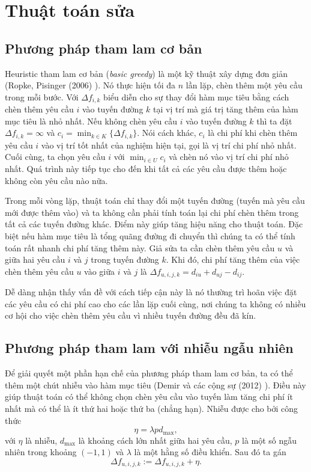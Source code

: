 \section{Thuật toán sửa}

\subsection{Phương pháp tham lam cơ bản}
\label{sec:basic_greedy}
Heuristic tham lam cơ bản (\textit{basic greedy}) là một kỹ thuật xây dựng đơn giản (Ropke, Pisinger (2006) \cite{ropke2006adaptive}). Nó thực hiện tối đa $n$ lần lặp, chèn thêm một yêu cầu trong mỗi bước. Với $\Delta f_{i, k}$ biểu diễn cho sự thay đổi hàm mục tiêu bằng cách chèn thêm yêu cầu $i$ vào tuyến đường $k$ tại vị trí mà giá trị tăng thêm của hàm mục tiêu là nhỏ nhất. Nếu không chèn yêu cầu $i$ vào tuyến đường $k$ thì ta đặt $\Delta f_{i, k} = \infty$ và $c_i = \min_{k \in K}\{\Delta f_{i, k}\}$. Nói cách khác, $c_i$ là chi phí khi chèn thêm yêu cầu $i$ vào vị trí tốt nhất của nghiệm hiện tại, gọi là vị trí chi phí nhỏ nhất. Cuối cùng, ta chọn yêu cầu $i$ với $\min_{i \in U} c_i$ và chèn nó vào vị trí chi phí nhỏ nhất. Quá trình này tiếp tục cho đến khi tất cả các yêu cầu được thêm hoặc không còn yêu cầu nào nữa.

Trong mỗi vòng lặp, thuật toán chỉ thay đổi một tuyến đường (tuyến mà yêu cầu mới được thêm vào) và ta không cần phải tính toán lại chi phí chèn thêm trong tất cả các tuyến đường khác. Điểm này giúp tăng hiệu năng cho thuật toán. Đặc biệt nếu hàm mục tiêu là tổng quãng đường đi chuyển thì chúng ta có thể tính toán rất nhanh chi phí tăng thêm này. Giả sửa ta cần chèn thêm yêu cầu $u$ và giữa hai yêu cầu $i$ và $j$ trong tuyến đường $k$. Khi đó, chi phí tăng thêm của việc chèn thêm yêu cầu $u$ vào giữa $i$ và $j$ là $\Delta f_{u, i, j, k} = d_{iu} + d_{uj} - d_{ij}$.

Dễ dàng nhận thấy vấn đề với cách tiếp cận này là nó thường trì hoãn việc đặt các yêu cầu có chi phí cao cho các lần lặp cuối cùng, nơi chúng ta không có nhiều cơ hội cho việc chèn thêm yêu cầu vì nhiều tuyến đường đều đã kín. 

\subsection{Phương pháp tham lam với nhiễu ngẫu nhiên}

Để giải quyết một phần hạn chế của phương pháp tham lam cơ bản, ta có thể thêm một chút nhiễu vào hàm mục tiêu (Demir và các cộng sự (2012) \cite{Demir2012}). Điều này giúp thuật toán có thể không chọn chèn yêu cầu vào tuyến làm tăng chi phí ít nhất mà có thể là ít thứ hai hoặc thứ ba (chẳng hạn). Nhiễu được cho bởi công thức
\begin{equation}
  \eta = \lambda p d_{\text{max}},
\end{equation}
với $\eta$ là nhiễu, $d_{\text{max}}$ là khoảng cách lớn nhất giữa hai yêu cầu, $p$ là một số ngẫu nhiên trong khoảng $(-1,1)$ và $\lambda$ là một hằng số điều khiển. Sau đó ta gán
\begin{equation}
  \Delta f_{u, i, j, k} := \Delta f_{u, i, j, k} + \eta.
\end{equation}

